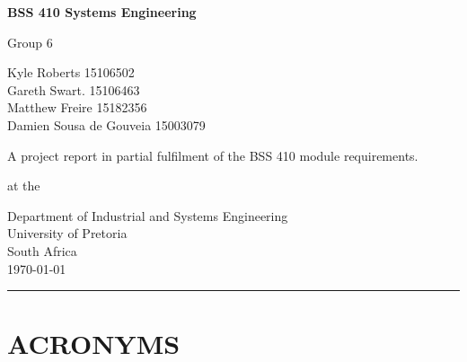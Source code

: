 \documentclass[a4paper,11pt,fleqn]{report}
\begin{document}
\begin{titlepage}
    \begin{center}
        \vspace*{1cm}
        
        \LARGE
        \textbf{BSS 410 Systems Engineering}
        
        \vspace{0.5cm}
        \LARGE
        Group 6
        
        \vspace{1.5cm}
        \large
        Kyle Roberts		15106502\\
        Gareth Swart.		15106463\\
		Matthew Freire		15182356\\
		Damien Sousa de Gouveia		15003079

        
        \vspace{7.8cm}
        
        \large
        A project report in partial fulfilment of the BSS 410 module requirements.\\
        
        
 		\vspace{1.4cm}           

		at the        
        
		 \vspace{2.2cm}     
           
        \large
        Department of Industrial and Systems Engineering\\
         \vspace{0.5cm}    
        University of Pretoria\\
         \vspace{0.5cm}    
        South Africa\\
        \vspace{1cm} 
        \today
        
    \end{center}
\end{titlepage}


\tableofcontents
\listoffigures


\vspace*{5mm} \hrule

\section*{ACRONYMS}
\begin{acronym}[ACRONYMS]

	\end{acronym}	
	
\end{document}

